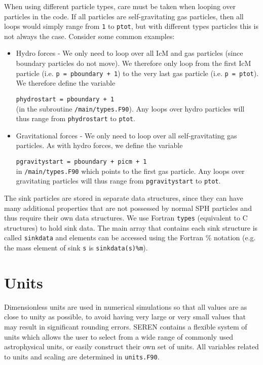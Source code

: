 \documentclass[a4paper]{article}
\newcommand{\NAME}{SEREN }
\newcommand{\var}[1]{\texttt{#1}}
\begin{document}
When using different particle types, care must be taken when looping over 
particles in the code.  If all particles are self-gravitating gas particles, 
then all loops would simply range from \var{1} to \var{ptot}, but with different types 
particles this is not always the case.  Consider some common examples: 
\begin{itemize}
\item Hydro forces - We only need to loop over all IcM and gas particles 
(since boundary particles do not move).  We therefore only loop from 
the first IcM particle (i.e. \var{p = pboundary + 1}) to the very last 
gas particle (i.e. \var{p = ptot}).  We therefore define the variable 
\newline

\var{phydrostart = pboundary + 1} \\

\noindent (in the subroutine \var{/main/types.F90}).  Any loops over 
hydro particles will thus range from \var{phydrostart} to \var{ptot}.

\item Gravitational forces - We only need to loop over all self-gravitating gas particles.  
As with hydro forces, we define the variable \newline 

\var{pgravitystart = pboundary + picm + 1} \\

in \var{/main/types.F90} which points to the first gas particle.  
Any loops over gravitating particles will thus range from 
\var{pgravitystart} to \var{ptot}.  
\end{itemize}

The sink particles are stored in separate data structures, since they can have many additional properties that are not possessed by normal SPH particles and thus require their own data structures.  We use Fortran \var{types} (equivalent to C structures) to hold sink data.  The main array that contains each sink structure is called \var{sinkdata} and elements can be accessed using the Fortran \% notation (e.g. the mass element of sink \var{s} is \var{sinkdata(s)\%m}).  


\newpage
\section{Units}
Dimensionless units are used in numerical simulations so that all 
values are as close to unity as possible, to avoid having very large 
or very small values that may result in significant rounding errors. 
\NAME contains a flexible system of units which allows the 
user to select from a wide range of commonly used astrophysical units, 
or easily construct their own set of units.  All variables related to 
units and scaling are determined in \var{units.F90}.  
\end{document}
